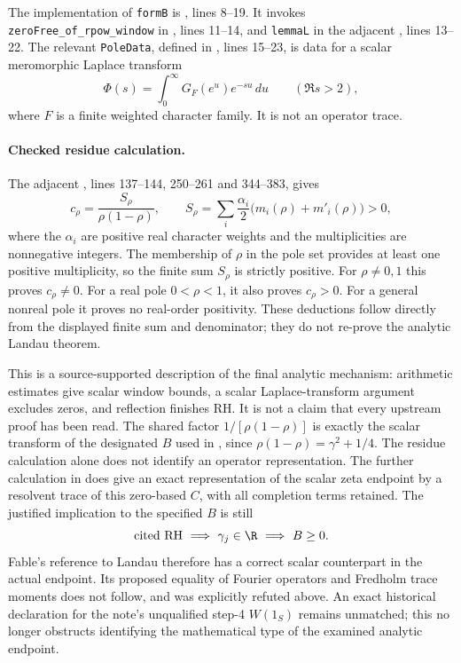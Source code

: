 The implementation of \texttt{formB} is , lines 8--19. It invokes \texttt{zeroFree\_of\_rpow\_window} in , lines 11--14, and \texttt{lemmaL} in the adjacent , lines 13--22. The relevant \texttt{PoleData}, defined in , lines 15--23, is data for a scalar meromorphic Laplace transform
\[
 \Phi(s)=\int_0^\infty G_F(e^u)e^{-su}\,du\qquad(\Re s>2),
\]
where $F$ is a finite weighted character family. It is not an operator trace.

\paragraph{Checked residue calculation.}
The adjacent , lines 137--144, 250--261 and 344--383, gives
\[
 c_\rho=\frac{S_\rho}{\rho(1-\rho)},\qquad
 S_\rho=\sum_i\frac{\alpha_i}{2}\bigl(m_i(\rho)+m'_i(\rho)\bigr)>0,
\]
where the $\alpha_i$ are positive real character weights and the multiplicities are nonnegative integers. The membership of $\rho$ in the pole set provides at least one positive multiplicity, so the finite sum $S_\rho$ is strictly positive. For $\rho\ne0,1$ this proves $c_\rho\ne0$. For a real pole $0<\rho<1$, it also proves $c_\rho>0$. For a general nonreal pole it proves no real-order positivity. These deductions follow directly from the displayed finite sum and denominator; they do not re-prove the analytic Landau theorem.

This is a source-supported description of the final analytic mechanism: arithmetic estimates give scalar window bounds, a scalar Laplace-transform argument excludes zeros, and reflection finishes RH. It is not a claim that every upstream proof has been read. The shared factor $1/[\rho(1-\rho)]$ is exactly the scalar transform of the designated $B$ used in , since $\rho(1-\rho)=\gamma^2+1/4$. The residue calculation alone does not identify an operator representation. The further calculation in  does give an exact representation of the scalar zeta endpoint by a resolvent trace of this zero-based $C$, with all completion terms retained. The justified implication to the specified $B$ is still
\[
 \text{cited RH}\ \Longrightarrow\ \gamma_j\in\R\ \Longrightarrow\ B\ge0.
\]
Fable's reference to Landau therefore has a correct scalar counterpart in the actual endpoint. Its proposed equality of Fourier operators and Fredholm trace moments does not follow, and was explicitly refuted above. An exact historical declaration for the note's unqualified step-4 $W(1_S)$ remains unmatched; this no longer obstructs identifying the mathematical type of the examined analytic endpoint.
